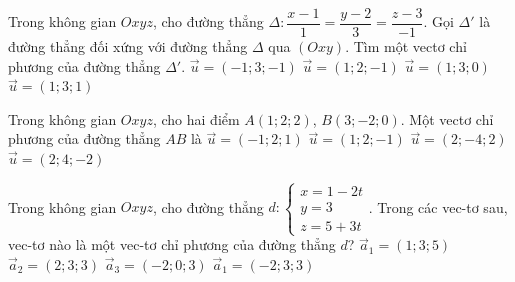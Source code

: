 	\begin{ex}%
	Trong không gian $Oxyz$, cho đường thẳng $\Delta\colon \dfrac{x-1}{1}=\dfrac{y-2}{3}=\dfrac{z-3}{-1}$. Gọi $\Delta'$ là đường thẳng đối xứng với đường thẳng $\Delta$ qua $(Oxy)$. Tìm một vectơ chỉ phương của đường thẳng $\Delta'$.
	\choice
	{$\overrightarrow{u}=(-1;3;-1)$}
	{$\overrightarrow{u}=(1;2;-1)$}
	{$\overrightarrow{u}=(1;3;0)$}
	{\True $\overrightarrow{u}=(1;3;1)$}
	\end{ex}
	\begin{ex}%
	Trong không gian $Oxyz$, cho hai điểm $A(1;2;2)$, $B(3;-2;0)$. Một vectơ chỉ phương của đường thẳng $AB$ là
	\choice
	{\True $\overrightarrow{u}=(-1;2;1)$}
	{$\overrightarrow{u}=(1;2;-1)$}
	{$\overrightarrow{u}=(2;-4;2)$}
	{$\overrightarrow{u}=(2;4;-2)$}
	\end{ex}
	\begin{ex}%
	Trong không gian $Oxyz$, cho đường thẳng $d:\begin{cases}x=1-2t \\ y=3 \\ z=5+3t \end{cases}$. Trong các vec-tơ sau, vec-tơ nào là một vec-tơ chỉ phương của đường thẳng $d$?
	\choice
	{$\overrightarrow{a}_1=(1;3;5)$}
	{$\overrightarrow{a}_2=(2;3;3)$}
	{\True $\overrightarrow{a}_3=(-2;0;3)$}
	{$\overrightarrow{a}_1=(-2;3;3)$}
	\end{ex}
